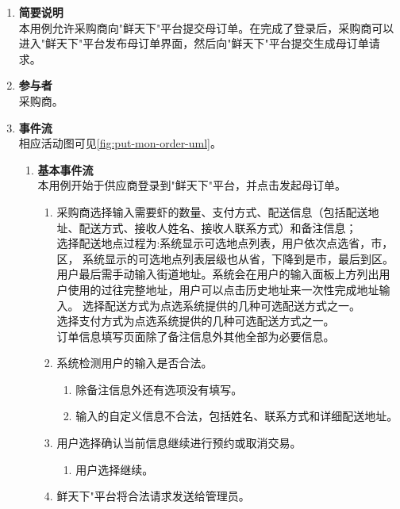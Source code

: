 \begin{enumerate}
    \item \textbf{简要说明}  \\ 本用例允许采购商向"鲜天下"平台提交母订单。在完成了登录后，采购商可以进入"鲜天下"平台发布母订单界面，然后向"鲜天下"平台提交生成母订单请求。
    \item \textbf{参与者} \\ 采购商。
    \item \textbf{事件流} \\ 相应活动图可见\autoref{fig:put-mon-order-uml}。
    \begin{enumerate} 
        \item \textbf{基本事件流} \\ 本用例开始于供应商登录到"鲜天下"平台，并点击发起母订单。
        \begin{enumerate}
            \item 采购商选择输入需要虾的数量、支付方式、配送信息（包括配送地址、配送方式、接收人姓名、接收人联系方式）和备注信息；\\
            选择配送地点过程为:系统显示可选地点列表，用户依次点选省，市，区， 系统显示的可选地点列表层级也从省，下降到是市，最后到区。用户最后需手动输入街道地址。系统会在用户的输入面板上方列出用户使用的过往完整地址，用户可以点击历史地址来一次性完成地址输入。
            选择配送方式为点选系统提供的几种可选配送方式之一。\\
            选择支付方式为点选系统提供的几种可选配送方式之一。\\
        ​    订单信息填写页面除了备注信息外其他全部为必要信息。\\

            \item 系统检测用户的输入是否合法。
            \begin{enumerate}
                \item 除备注信息外还有选项没有填写。
                \item 输入的自定义信息不合法，包括姓名、联系方式和详细配送地址。
            \end{enumerate}

            \item 用户选择确认当前信息继续进行预约或取消交易。
            \begin{enumerate}
                \item 用户选择继续。
            \end{enumerate}

            \item 鲜天下"平台将合法请求发送给管理员。
            

\end{enumerate}
\end{enumerate}
\end{enumerate}
